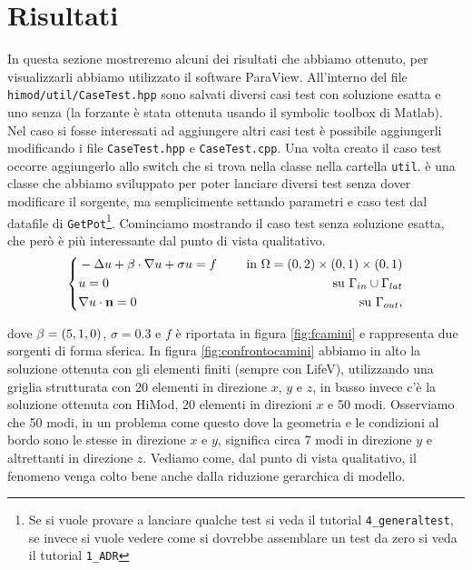 \chapter{Risultati}
In questa sezione mostreremo alcuni dei risultati che abbiamo ottenuto, per visualizzarli abbiamo utilizzato
il software ParaView.
All'interno del file \texttt{himod/util/CaseTest.hpp} sono salvati diversi casi test
con soluzione esatta e uno senza (la forzante \`e stata ottenuta usando il symbolic toolbox di Matlab).
Nel caso si fosse interessati ad aggiungere altri casi test \`e possibile aggiungerli modificando i
file \texttt{CaseTest.hpp} e \texttt{CaseTest.cpp}. Una volta creato il caso test 
occorre aggiungerlo allo switch che si trova nella classe  nella
cartella \texttt{util}.  \`e una classe che abbiamo sviluppato per poter
lanciare diversi test senza dover modificare il sorgente, ma semplicimente settando 
parametri  e caso test dal datafile di \texttt{GetPot}\footnote{Se si vuole provare a lanciare qualche test si veda il tutorial
\texttt{4\_generaltest}, se invece si vuole vedere come si dovrebbe assemblare un test da zero si veda il tutorial \texttt{1\_ADR} }.
Cominciamo mostrando il caso test senza soluzione esatta, che per\`o \`e pi\`u interessante dal punto di vista qualitativo.
\begin{equation}
 \label{eq:camini}
 \left\{
\begin{aligned}
 &-\Delta u + \mathbf{\beta}\cdot\nabla u + \sigma u = f &\quad \text{ in }\Omega=(0,2)\times(0,1)\times(0,1)\\
 &u=0 &\quad \text{ su } \Gamma_{in} \cup \Gamma_{lat}\\
 &\nabla u\cdot \mathbf{n} = 0 &\quad \text{ su } \Gamma_{out},
\end{aligned}
\right.
\end{equation}

dove $\mathbf{\beta}=(5,1,0)$, $\sigma=0.3$ e $f$ \`e riportata in figura \ref{fig:fcamini} e rappresenta due sorgenti 
di forma sferica.
In figura \ref{fig:confrontocamini} abbiamo in alto la soluzione ottenuta con
gli elementi finiti (sempre con LifeV), utilizzando una griglia strutturata con 20 elementi in direzione $x$, $y$ e $z$, in basso invece c'\`e la soluzione ottenuta con HiMod, 20 elementi in direzioni $x$ e 50 modi.
Osserviamo che 50 modi, in un problema come questo dove la geometria e le condizioni al bordo sono le stesse in direzione $x$ e $y$, significa circa 7 modi in direzione $y$ e altrettanti in direzione $z$.
 Vediamo come, dal punto di vista qualitativo, il fenomeno venga colto bene anche dalla riduzione gerarchica di modello.

